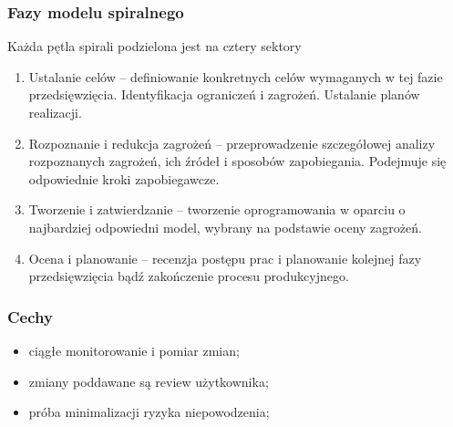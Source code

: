 \documentclass[12pt]{article}
\begin{document}
    \subsubsection{Fazy modelu spiralnego}
    Każda pętla spirali podzielona jest na cztery sektory
    \begin{enumerate}
        \item Ustalanie celów – definiowanie konkretnych celów wymaganych w tej fazie przedsięwzięcia. Identyfikacja ograniczeń i zagrożeń. Ustalanie planów realizacji.
        \item Rozpoznanie i redukcja zagrożeń – przeprowadzenie szczegółowej analizy rozpoznanych zagrożeń, ich źródeł i sposobów zapobiegania. Podejmuje się odpowiednie kroki zapobiegawcze.
        \item Tworzenie i zatwierdzanie – tworzenie oprogramowania w oparciu o najbardziej odpowiedni model, wybrany na podstawie oceny zagrożeń.
        \item Ocena i planowanie – recenzja postępu prac i planowanie kolejnej fazy przedsięwzięcia bądź zakończenie procesu produkcyjnego.
    \end{enumerate}

    \subsubsection{Cechy}
    \begin{itemize}
        \item ciągłe monitorowanie i pomiar zmian;
        \item zmiany poddawane są review użytkownika;
        \item próba minimalizacji ryzyka niepowodzenia;
    \end{itemize}
\end{document}
